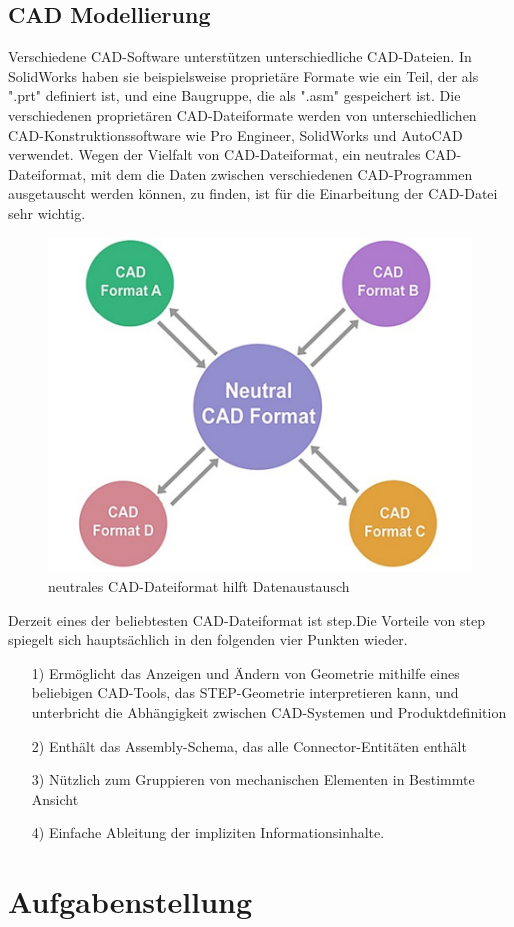 \documentclass[14pt,a4paper,titlepage]{article}
\begin{document}
	\subsection{CAD Modellierung}
		Verschiedene CAD-Software unterstützen unterschiedliche CAD-Dateien. In SolidWorks haben sie beispielsweise proprietäre Formate wie ein Teil, der als ".prt" definiert ist, und eine Baugruppe, die als ".asm" gespeichert ist. Die verschiedenen proprietären CAD-Dateiformate werden von unterschiedlichen CAD-Konstruktionssoftware wie Pro Engineer, SolidWorks und AutoCAD verwendet. Wegen der Vielfalt von CAD-Dateiformat, ein neutrales CAD-Dateiformat, mit dem die Daten zwischen verschiedenen CAD-Programmen ausgetauscht werden können, zu finden, ist für die Einarbeitung der CAD-Datei sehr wichtig.
		\begin{figure}[h!]
			\centering
			\includegraphics[width=0.5\linewidth]{cad.png}
			\caption{neutrales CAD-Dateiformat hilft Datenaustausch}
		\end{figure}
		\break
		Derzeit eines der beliebtesten CAD-Dateiformat ist \acs{step}.Die Vorteile von \acs{step} spiegelt sich hauptsächlich in den folgenden vier Punkten wieder.
		\begin{itemize}
			\item[1)]
			Ermöglicht das Anzeigen und Ändern von Geometrie mithilfe eines beliebigen CAD-Tools, das STEP-Geometrie interpretieren kann, und unterbricht die Abhängigkeit zwischen CAD-Systemen und Produktdefinition
			\item[2)] 
			Enthält das Assembly-Schema, das alle Connector-Entitäten enthält
			\item[3)] 
			Nützlich zum Gruppieren von mechanischen Elementen in Bestimmte Ansicht
			\item[4)] 
			Einfache Ableitung der impliziten Informationsinhalte. 
		\end{itemize}  
	\section{Aufgabenstellung}
\end{document}
